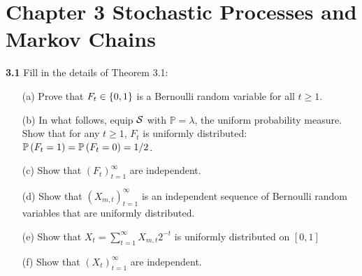 
\chapter*{Chapter 3 Stochastic Processes and Markov Chains}
\label{sec:3}

\noindent\textbf{3.1} Fill in the details of Theorem 3.1:


\begin{enumerate}
   \item[(a)] Prove that $F_t \in \left\{ 0,1 \right\}$ is a Bernoulli random variable for all $t \ge 1$.
   \item[(b)] In what follows, equip $\mathcal{S}$ with $\mathbb{P}=\lambda$, the uniform probability measure. Show that for any $t \ge 1$, $F_t$ is uniformly distributed: $\mathbb{P} \left(F_t= 1 \right) = \mathbb{P} \left(F_t = 0\right) = 1/2$. 
   \item[(c)] Show that $(F_t)_{t=1}^{\infty}$ are independent.
   \item[(d)] Show that $(X_{m,t})_{t=1}^\infty$ is an independent sequence of Bernoulli random variables that are uniformly distributed.
   \item[(e)] Show that $X_t = \sum_{t=1}^\infty X_{m,t}2^{-t}$ is uniformly distributed on $[0,1]$
   \item[(f)] Show that $(X_t)_{t=1}^\infty$ are independent.
\end{enumerate}

